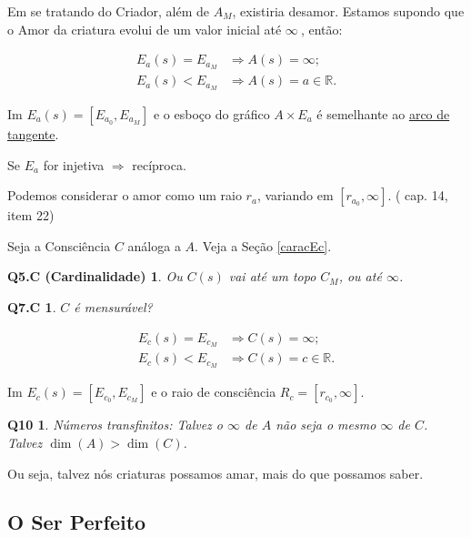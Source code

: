 \documentclass[12pt,a4paper]{article}
\begin{document}
			Em se tratando do Criador, al\'em de $ A_M $, existiria desamor. Estamos supondo que o Amor da criatura evolui de um valor inicial at\'e $ \infty \ $, ent\~ao:

			\begin{align*}
				E_a(s) = E_{a_M} &\Rightarrow A(s) = \infty; \\
				E_a(s) < E_{a_M} &\Rightarrow A(s) = a \in \mathbb{R}.
			\end{align*}

			Im $ E_a(s) = [E_{a_0}, E_{a_M}] $ e o esbo\c{c}o do gr\'afico $ A \times E_a $ \'e semelhante ao \href{http://mathworld.wolfram.com/InverseTangent.html}{arco de tangente}.

			Se $E_a$ for injetiva $\Rightarrow$ rec\'iproca.

			Podemos considerar o amor como um raio $ r_a $, variando em $ [r_{a_0}, \infty] $. (\cite{genese} cap. 14, item 22)

			Seja a Consci\^encia $C$ an\'aloga a $A$. Veja a Se\c{c}\~ao \ref{caracEc}.

			\newtheorem{Q5.C}{Q5.C (Cardinalidade)}
			\begin{Q5.C} Ou $C(s)$ vai at\'e um topo $ C_M $, ou at\'e $ \infty $.
			\end{Q5.C}

			\newtheorem{Q7.C}{Q7.C}
			\begin{Q7.C} $C$ \'e mensur\'avel?
			\end{Q7.C}

			\begin{align*}
				E_c(s) = E_{c_M} &\Rightarrow C(s) = \infty; \\
				E_c(s) < E_{c_M} &\Rightarrow C(s) = c \in \mathbb{R}.
			\end{align*}

			Im $ E_c(s) = [E_{c_0}, E_{c_M}] $ e o raio de consci\^encia $ R_c = [r_{c_0}, \infty] $.

			\newtheorem{Q10}{Q10}
			\begin{Q10} N\'umeros transfinitos: Talvez o $ \infty $ de $A$ n\~ao seja o mesmo $ \infty $ de $C$. Talvez $ \dim(A) > \dim(C) $.
			\end{Q10}

			Ou seja, talvez n\'os criaturas possamos amar, mais do que possamos saber.

		\subsection{O Ser Perfeito}\label{serPerfeito}
			\begin{flushright}
			\end{flushright}
\end{document}
